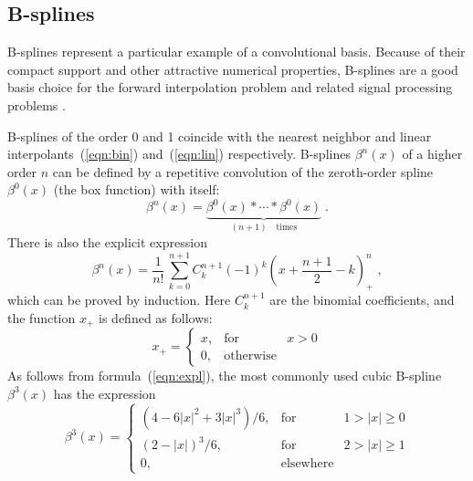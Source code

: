 
\subsection{B-splines}

B-splines represent a particular example of a convolutional basis.
Because of their compact support and other attractive numerical
properties, B-splines are a good basis choice for the forward
interpolation problem and related signal processing problems \cite{unser}.
\par
B-splines of the order 0 and 1 coincide with the nearest neighbor and
linear interpolants~(\ref{eqn:bin}) and~(\ref{eqn:lin}) respectively.
B-splines $\beta^n(x)$ of a higher order $n$ can be defined by a
repetitive convolution of the zeroth-order spline $\beta^0(x)$ (the
box function) with itself:
\begin{equation}
\label{eqn:bdef}
\beta^n(x) = 
\underbrace{\beta^0(x) \ast \cdots \ast \beta^0(x)}_{(n+1)\quad 
\mbox{times}}\;.
\end{equation}
There is also the explicit expression
\begin{equation}
\label{eqn:expl}
\beta^n(x) = 
\frac{1}{n!}\,\sum_{k=0}^{n+1} C_k^{n+1} (-1)^k 
(x + \frac{n+1}{2} - k)_{+}^n\;,
\end{equation}
which can be proved by induction. Here $C_k^{n+1}$ are the binomial
coefficients, and the function $x_{+}$ is defined as follows:
\begin{equation}
  \label{eqn:xp}
  x_{+} = \left\{\begin{array}{lcr}
x, & \mbox{for} & x > 0 \\
0, & \mbox{otherwise} &
\end{array}\right.
\end{equation}
As follows from formula~(\ref{eqn:expl}), the most commonly used cubic
B-spline $\beta^3(x)$ has the expression
\begin{equation}
  \label{eqn:beta3}
  \beta^3(x) = \left\{\begin{array}{lcr}
\displaystyle \left(4-6 |x|^2+3 |x|^3\right)/6, & 
\mbox{for} & 1 > |x| \geq 0 \\
\displaystyle (2-|x|)^3/6, & \mbox{for} & 2 > |x| \geq 1 \\
0, & \mbox{elsewhere} &
\end{array}\right.
\end{equation}
